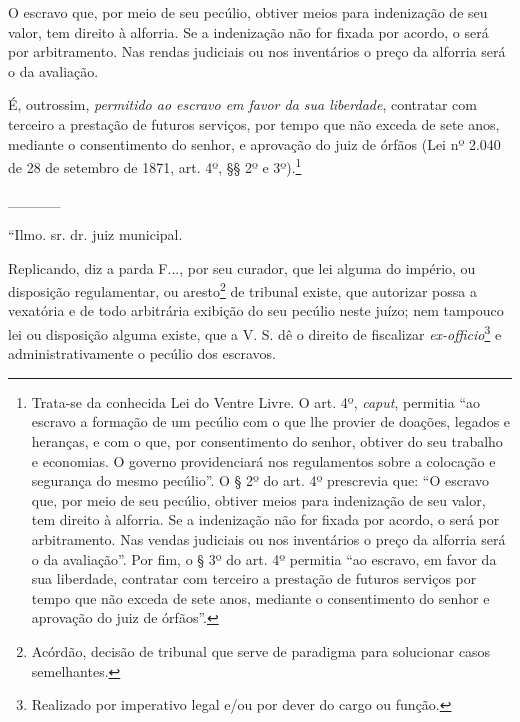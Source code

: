 {O escravo que, por meio de seu pecúlio, obtiver meios para indenização
de seu valor, tem direito à alforria. Se a indenização não for fixada
por acordo, o será por arbitramento. Nas rendas judiciais ou nos
inventários o preço da alforria será o da avaliação.

É, outrossim, \emph{permitido ao escravo em favor da sua liberdade},
contratar com terceiro a prestação de futuros serviços, por tempo que
não exceda de sete anos, mediante o consentimento do senhor, e aprovação
do juiz de órfãos (Lei nº 2.040 de 28 de setembro de 1871, art. 4º, §§
2º e 3º).\footnote{ Trata-se da conhecida Lei do Ventre Livre. O art.
  4º, \emph{caput}, permitia ``ao escravo a formação de um pecúlio com o
  que lhe provier de doações, legados e heranças, e com o que, por
  consentimento do senhor, obtiver do seu trabalho e economias. O
  governo providenciará nos regulamentos sobre a colocação e segurança
  do mesmo pecúlio''. O § 2º do art. 4º prescrevia que: ``O escravo que,
  por meio de seu pecúlio, obtiver meios para indenização de seu valor,
  tem direito à alforria. Se a indenização não for fixada por acordo, o
  será por arbitramento. Nas vendas judiciais ou nos inventários o preço
  da alforria será o da avaliação''. Por fim, o § 3º do art. 4º permitia
  ``ao escravo, em favor da sua liberdade, contratar com terceiro a
  prestação de futuros serviços por tempo que não exceda de sete anos,
  mediante o consentimento do senhor e aprovação do juiz de órfãos''.}

\_\_\_\_\_

``Ilmo. sr. dr. juiz municipal.

Replicando, diz a parda F..., por seu curador, que lei alguma do
império, ou disposição regulamentar, ou aresto\footnote{ Acórdão,
  decisão de tribunal que serve de paradigma para solucionar casos
  semelhantes.} de tribunal existe, que autorizar possa a vexatória e de
todo arbitrária exibição do seu pecúlio neste juízo; nem tampouco lei ou
disposição alguma existe, que a V. S. dê o direito de fiscalizar
\emph{ex-officio}\footnote{ Realizado por imperativo legal e/ou por
  dever do cargo ou função.} e administrativamente o pecúlio dos
escravos.

}
